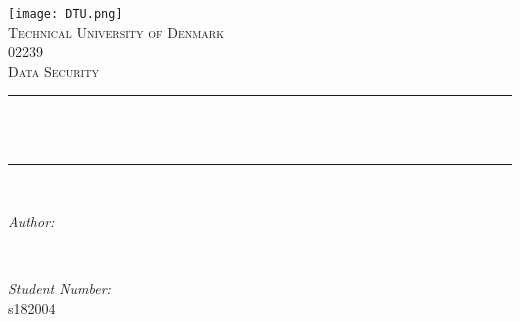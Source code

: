 \begin{titlepage}
	\centering
    \vspace*{0.5 cm}
    \texttt{[image: DTU.png]}\\[1.0 cm]	        		%
    \textsc{\LARGE Technical University of Denmark}\\[2.0 cm]	%
	\textsc{\Large 02239}\\[0.5 cm]				        						%
	\textsc{\large Data Security}\\[0.5 cm]				        				%
	\rule{\linewidth}{0.2 mm} \\[0.4 cm]
	{ \huge \bfseries \thetitle}\\
	\rule{\linewidth}{0.2 mm} \\[1.5 cm]
	
	\begin{minipage}{0.4\textwidth}
		\begin{flushleft} \large
			\emph{Author:}\\
			\theauthor
		\end{flushleft}
	\end{minipage}~
	\begin{minipage}{0.4\textwidth}
		\begin{flushright} \large
			\emph{Student Number:} \\
			s182004									%
		\end{flushright}
	\end{minipage}\\[2 cm]
	
	{\large \thedate}\\[2 cm]
	\vfill
\end{titlepage}